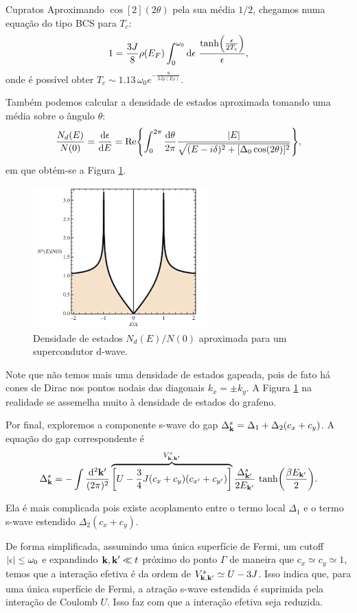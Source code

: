 \documentclass[a4paper,10pt]{article}
\begin{document}
\begin{section}{Cupratos}
Aproximando $\cos[2](2\theta)$ pela sua média $1/2$, chegamos numa equação do tipo BCS para $T_c$:
$$
1 = \frac{3J}{8} \rho(E_F) \int_0^{\omega_0} \dd{\epsilon} \,
\frac{\tanh(\frac{\epsilon}{2T_c})}{\epsilon},
$$
onde é possível obter $T_c \sim 1.13 \, \omega_0 e^{-\frac{8}{3 J \rho(E_F)}}$.


\n

Também podemos calcular a densidade de estados aproximada tomando uma média sobre o ângulo $\theta$:
$$
\frac{N_d(E)}{N(0)} = \dv{\epsilon}{E} =
\Re{\int_0^{2\pi} \frac{\dd{\theta}}{2\pi}
\frac{\abs{E}}{\sqrt{(E - i\delta)^2 + [\Delta_0 \cos(2\theta)]^2}}
},
$$
em que obtém-se a Figura \ref{fig:dwavedos}.

\begin{figure}[H]
\centering
\includegraphics[width=0.6\textwidth]{fig/dwavedos.png}
\caption{Densidade de estados $N_d(E)/N(0)$ aproximada para um supercondutor d-wave.}
\label{fig:dwavedos}
\end{figure}

Note que não temos mais uma densidade de estados gapeada, pois de fato há cones de Dirac nos pontos nodais das diagonais $k_x = \pm k_y$. A Figura \ref{fig:dwavedos} na realidade se assemelha muito à densidade de estados do grafeno.

\n

Por final, exploremos a componente s-wave do gap $\Delta_{\vb{k}}^s = \Delta_1 + \Delta_2 (c_x + c_y)$. A equação do gap correspondente é
$$
\Delta_{\vb{k}}^s = - \int \frac{\dd[2]{\vb{k}'}}{(2\pi)^2}
\overbrace{\qty[U - \frac{3}{4} J (c_x + c_y)(c_{x'}+ c_{y'})]}^{V_{\vb{k},\vb{k}'}^s}
\frac{\Delta_{\vb{k}'}^s}{2 E_{\vb{k}'}} \, \tanh(\frac{\beta E_{\vb{k}'}}{2}).
$$

Ela é mais complicada pois existe acoplamento entre o termo local $\Delta_1$ e o termo s-wave estendido $\Delta_2 (c_x + c_y)$.

\n

De forma simplificada, assumindo uma única superfície de Fermi, um cutoff $\abs{\epsilon} \leq \omega_0$ e expandindo $\vb{k}, \vb{k}' \ll t$ próximo do ponto $\Gamma$ de maneira que $c_x \simeq c_y \simeq 1$, temos que a interação efetiva é da ordem de $V_{\vb{k},\vb{k}'}^s \simeq U - 3J$. Isso indica que, para uma única superfície de Fermi, a atração s-wave estendida é suprimida pela interação de Coulomb $U$. Isso faz com que a interação efetiva seja reduzida.


\end{section}
\end{document}
